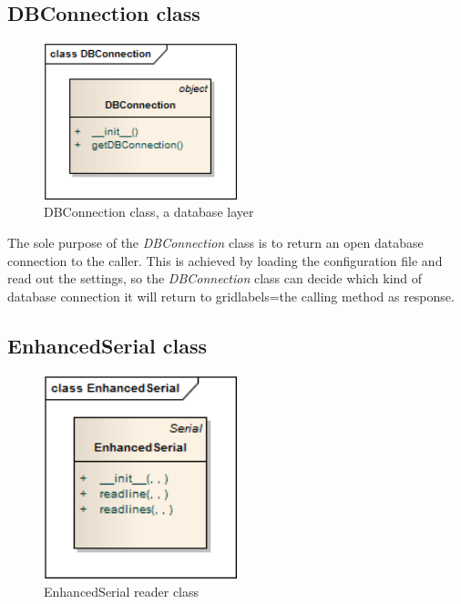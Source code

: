 \newpage
\subsection{DBConnection class}
\begin{figure}[H]
   \centering
   \includegraphics[width=0.5\textwidth]{pic/DBConnection.png}%
   \caption{DBConnection class, a database layer}
   \label{DBConnectionpic}%
\end{figure}

The sole purpose of the \textit{DBConnection} class is to return an open database connection to the caller. 
This is achieved by loading the configuration file and read out the settings, so the \textit{DBConnection} 
class can decide which kind of database connection it will return to gridlabels=the calling method as response.

\newpage
\subsection{EnhancedSerial class}
\begin{figure}[H]
   \centering
   \includegraphics[width=0.5\textwidth]{pic/EnhancedSerial.png}%
   \caption{EnhancedSerial reader class}
   \label{EnhancedSerialpic}%
\end{figure}

